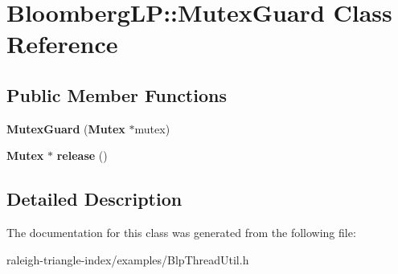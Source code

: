 \section{Bloomberg\+LP\+:\+:Mutex\+Guard Class Reference}
\label{class_bloomberg_l_p_1_1_mutex_guard}
\subsection*{Public Member Functions}
\begin{DoxyCompactItemize}
\item 
{\bfseries Mutex\+Guard} ({\bf Mutex} $\ast$mutex)\label{class_bloomberg_l_p_1_1_mutex_guard_a820c69be46df988f5594027171158a88}

\item 
{\bf Mutex} $\ast$ {\bfseries release} ()\label{class_bloomberg_l_p_1_1_mutex_guard_a12d09354299adec6866cced20b26a860}

\end{DoxyCompactItemize}


\subsection{Detailed Description}


The documentation for this class was generated from the following file\+:\begin{DoxyCompactItemize}
\item 
raleigh-\/triangle-\/index/examples/Blp\+Thread\+Util.\+h\end{DoxyCompactItemize}

